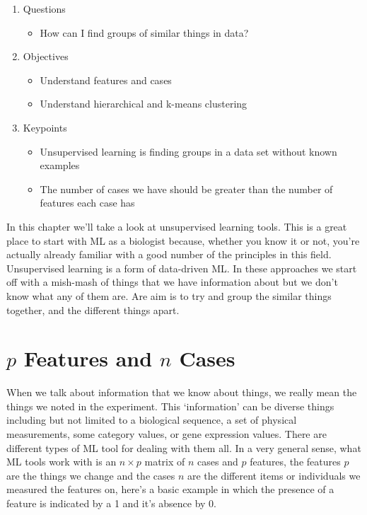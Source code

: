 \documentclass[
]{book}
\providecommand{\tightlist}{%
  \setlength{\itemsep}{0pt}\setlength{\parskip}{0pt}}
\begin{document}
\begin{enumerate}
\def\labelenumi{\arabic{enumi}.}
\tightlist
\item
  Questions

  \begin{itemize}
  \tightlist
  \item
    How can I find groups of similar things in data?
  \end{itemize}
\item
  Objectives

  \begin{itemize}
  \tightlist
  \item
    Understand features and cases
  \item
    Understand hierarchical and k-means clustering
  \end{itemize}
\item
  Keypoints

  \begin{itemize}
  \tightlist
  \item
    Unsupervised learning is finding groups in a data set without known examples
  \item
    The number of cases we have should be greater than the number of features each case has
  \end{itemize}
\end{enumerate}

In this chapter we'll take a look at unsupervised learning tools. This is a great place to start with ML as a biologist because, whether you know it or not, you're actually already familiar with a good number of the principles in this field. Unsupervised learning is a form of data-driven ML. In these approaches we start off with a mish-mash of things that we have information about but we don't know what any of them are. Are aim is to try and group the similar things together, and the different things apart.

\hypertarget{p-features-and-n-cases}{%
\section{\texorpdfstring{\(p\) Features and \(n\) Cases}{p Features and n Cases}}\label{p-features-and-n-cases}}

When we talk about information that we know about things, we really mean the things we noted in the experiment. This `information' can be diverse things including but not limited to a biological sequence, a set of physical measurements, some category values, or gene expression values. There are different types of ML tool for dealing with them all. In a very general sense, what ML tools work with is an \(n \times p\) matrix of \(n\) cases and \(p\) features, the features \(p\) are the things we change and the cases \(n\) are the different items or individuals we measured the features on, here's a basic example in which the presence of a feature is indicated by a 1 and it's absence by 0.
\end{document}
